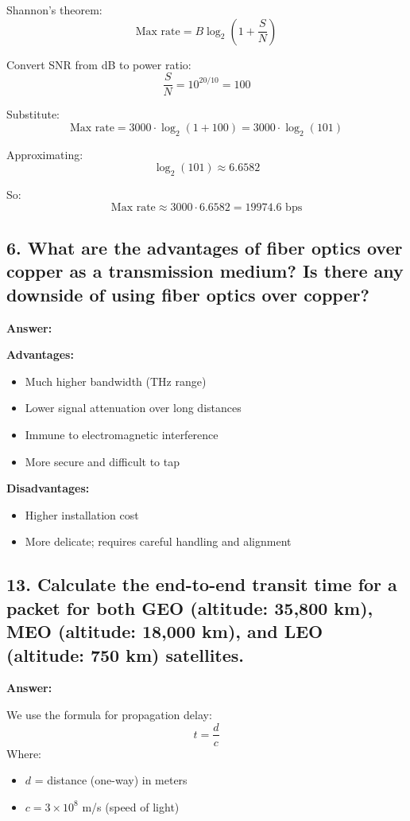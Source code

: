 \documentclass{article}
\begin{document}
Shannon’s theorem:
\[
\text{Max rate} = B \log_2\left(1 + \frac{S}{N} \right)
\]

Convert SNR from dB to power ratio:
\[
\frac{S}{N} = 10^{20/10} = 100
\]

Substitute:
\[
\text{Max rate} = 3000 \cdot \log_2(1 + 100) = 3000 \cdot \log_2(101)
\]

Approximating:
\[
\log_2(101) \approx 6.6582
\]

So:
\[
\text{Max rate} \approx 3000 \cdot 6.6582 = 19974.6 \text{ bps}
\]

\subsection*{6. What are the advantages of fiber optics over copper as a transmission medium? Is there any downside of using fiber optics over copper?}

\textbf{Answer:}

\textbf{Advantages:}
\begin{itemize}[noitemsep]
  \item Much higher bandwidth (THz range)
  \item Lower signal attenuation over long distances
  \item Immune to electromagnetic interference
  \item More secure and difficult to tap
\end{itemize}

\textbf{Disadvantages:}
\begin{itemize}[noitemsep]
  \item Higher installation cost
  \item More delicate; requires careful handling and alignment
\end{itemize}

\subsection*{13. Calculate the end-to-end transit time for a packet for both GEO (altitude: 35,800 km), MEO (altitude: 18,000 km), and LEO (altitude: 750 km) satellites.}

\textbf{Answer:}

We use the formula for propagation delay:
\[
 t = \frac{d}{c}
\]
Where:
\begin{itemize}
  \item $d$ = distance (one-way) in meters
  \item $c = 3 \times 10^8$ m/s (speed of light)
\end{itemize}
\end{document}
